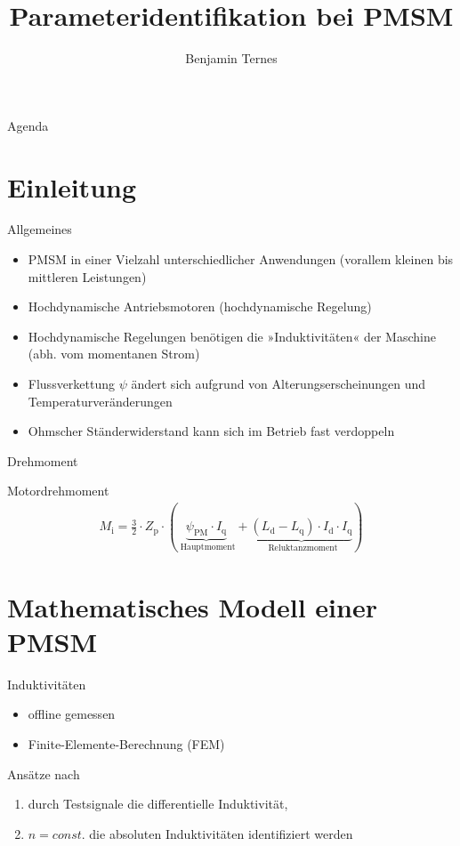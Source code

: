 \documentclass{beamer}
\title[Parameteridentifikation]{Parameteridentifikation bei PMSM}
\author[Benjamin Ternes]%
{%
Benjamin Ternes
}
\institute{%
Fachbereich Elektrotechnik und Informatik}
\renewcommand{\i}[1]{\mathrm{#1}}  				%
\begin{document}
\begin{frame}[plain]
	\titlepage
\end{frame}

\begin{frame}[plain]{Agenda}
	\tableofcontents
\end{frame}

\section{Einleitung}
\begin{frame}{Allgemeines}
\begin{itemize}
\item PMSM in einer Vielzahl unterschiedlicher Anwendungen (vorallem kleinen bis mittleren Leistungen)
\item Hochdynamische Antriebsmotoren (hochdynamische Regelung)
\item Hochdynamische Regelungen benötigen die »Induktivitäten« der Maschine (abh. vom momentanen Strom)
\item Flussverkettung $\psi$ ändert sich aufgrund von Alterungserscheinungen und Temperaturveränderungen
\item Ohmscher Ständerwiderstand kann sich im Betrieb fast verdoppeln
\end{itemize}
\end{frame}

\begin{frame}{Drehmoment}
\begin{block}{Motordrehmoment}
\begin{align}
M_\i{i}= \frac{3}{2}\cdot Z_\i{p} \cdot (\underbrace{\psi_\i{PM}\cdot I_\i{q}}_\i{\text{~Hauptmoment}} + \underbrace{(L_\i{d}-L_\i{q})\cdot I_\i{d}\cdot I_\i{q}}_\i{\text{~Reluktanzmoment}})
\end{align}
\end{block}
\end{frame}

\section{Mathematisches Modell einer PMSM}
\begin{frame}{Induktivitäten}
\begin{itemize}
\item offline gemessen
\item Finite-Elemente-Berechnung (FEM)
\end{itemize}
Ansätze nach \textcite{kellner2012}
\begin{enumerate}
\item durch Testsignale die differentielle Induktivität,
\item $n=const.$ die absoluten Induktivitäten identifiziert werden
\end{enumerate}
\end{frame}
\end{document}
